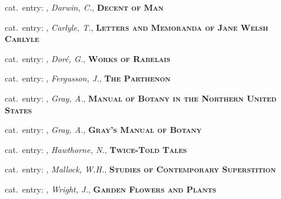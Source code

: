 \vbox{%
  \vspace*{0.5 cm}
  \noindent
  {\footnotesize{}\hspace{1em}cat.~entry: , \textit{Darwin, C.}, \textsc{\bfseries Decent of Man}}
}

\vbox{%
  \vspace*{0.5 cm}
  \noindent
  {\footnotesize{}\hspace{1em}cat.~entry: , \textit{Carlyle, T.}, \textsc{\bfseries Letters and Memoranda of Jane Welsh Carlyle}}
}


\vbox{%
  \vspace*{0.5 cm}
  \noindent
  {\footnotesize{}\hspace{1em}cat.~entry: , \textit{Doré, G.}, \textsc{\bfseries Works of Rabelais}}
}

\vbox{%
  \vspace*{0.5 cm}
  \noindent
  {\footnotesize{}\hspace{1em}cat.~entry: , \textit{Fergusson, J.}, \textsc{\bfseries The Parthenon}}
}

\vbox{%
  \vspace*{0.5 cm}
  \noindent
  {\footnotesize{}\hspace{1em}cat.~entry: , \textit{Gray, A.}, \textsc{\bfseries Manual of Botany in the Northern United States}}
}

\vbox{%
  \vspace*{0.5 cm}
  \noindent
  {\footnotesize{}\hspace{1em}cat.~entry: , \textit{Gray, A.}, \textsc{\bfseries Gray’s Manual of Botany}}
}

\vbox{%
  \vspace*{0.5 cm}
  \noindent
  {\footnotesize{}\hspace{1em}cat.~entry: , \textit{Hawthorne, N.}, \textsc{\bfseries Twice-Told Tales}}
}

\vbox{%
  \vspace*{0.5 cm}
  \noindent
  {\footnotesize{}\hspace{1em}cat.~entry: , \textit{Mallock, W.H.}, \textsc{\bfseries Studies of Contemporary Superstition}}
}

\vbox{%
  \vspace*{0.5 cm}
  \noindent
  {\footnotesize{}\hspace{1em}cat.~entry: , \textit{Wright, J.}, \textsc{\bfseries Garden Flowers and Plants}}
}

